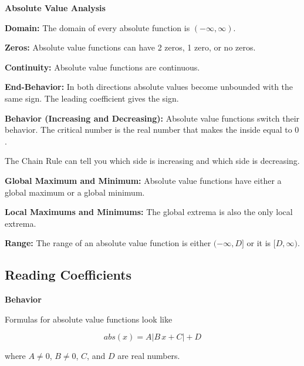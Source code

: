 \documentclass{ximera}
\begin{document}
\begin{summary}\textbf{\textcolor{red!70!yellow}{Absolute Value Analysis}}


\textbf{Domain:} The domain of every absolute function is $(-\infty, \infty)$.

\textbf{Zeros:} Absolute value functions can have 2 zeros, 1 zero, or no zeros.

\textbf{Continuity:} Absolute value functions are continuous.

\textbf{End-Behavior:} In both directions absolute values become unbounded with the same sign.  The leading coefficient gives the sign.






\textbf{Behavior (Increasing and Decreasing):} Absolute value functions switch their behavior. The critical number is the real number that makes the inside equal to $0$.

The Chain Rule can tell you which side is increasing and which side is decreasing.

\textbf{Global Maximum and Minimum:}  Absolute value functions have either a global maximum or a global minimum.

\textbf{Local Maximums and Minimums:} The global extrema is also the only local extrema.

\textbf{Range:} The range of an absolute value function is either $(-\infty, D]$ or it is $[D, \infty)$.



\end{summary}




















\subsection*{Reading Coefficients}



\textbf{Behavior}


Formulas for absolute value functions look like

\[     abs(x) =    A  | B \, x + C | + D           \]

where $A \ne 0$, $B \ne 0$, $C$, and $D$ are real numbers.
\end{document}
